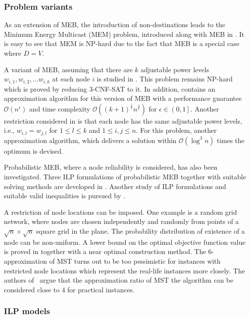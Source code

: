 \subsubsection{Problem variants}

As an extension of MEB, the introduction of non-destinations leads to the Minimum Energy Multicast (MEM) problem, introduced along with MEB in \cite{wieselthier00}.
It is easy to see that MEM is NP-hard due to the fact that MEB is a special case where $D=V$. %

A variant of MEB, assuming that there are $k$ adjustable power levels $w_{i,1},w_{i,2},\dots w_{i,k}$ at each node $i$ is studied in \cite{liang02}.
This problem remains NP-hard which is proved by reducing \textsc{3-CNF-SAT} to it.
In addition, \cite{liang02} contains an approximation algorithm for this version of MEB with a performance guarantee $\mathcal{O}(n^\epsilon)$ and 
time complexity $\mathcal{O}((k+1)^{\frac{1}{\epsilon}} n^{\frac{3}{\epsilon}})$ for $\epsilon\in \left(0,1\right]$.
Another restriction considered in \cite{liang02} is that each node has the same adjustable power levels, i.e., $w_{i,l}=w_{j,l}$ for $1\leq l\leq k$ and $1\leq i,j\leq n$.
For this problem, another approximation algorithm, which delivers a solution within $\mathcal{O}(\log^3 n)$ times the optimum is devised.

Probabilistic MEB, where a node reliability is considered, has also been investigated.
Three ILP formulations of probabilistic MEB together with suitable solving methods are developed in \cite{montemanni08}.
Another study of ILP formulations and suitable valid inequalities is pursued by \cite{barta10}.

A restriction of node locations can be imposed.
One example is a random grid network, where nodes are chosen independently and randomly from points of a $\sqrt{n}\times\sqrt{n}$ square grid in the plane.
The probability distribution of existence of a node can be non-uniform.
A lower bound on the optimal objective function value is proved in \cite{calamoneri08} together with a near optimal construction method.
The 6-approximation of MST turns out to be too pessimistic for instances with restricted node locations which represent the real-life instances more closely.
The authors of~\cite{flammini07} argue that the approximation ratio of MST the algorithm can be considered close to 4 for practical instances.

\subsubsection{ILP models}

